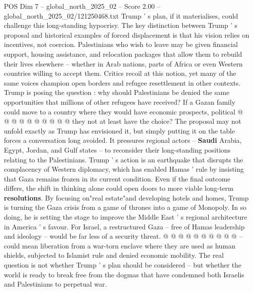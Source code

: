 \begin{textsample}{POS Dim 7 – global\_north\_2025\_02 – Score 2.00 – global\_north\_2025\_02/121250468.txt}
Trump ' s plan, if it materialises, could challenge this long-standing hypocrisy.
The key distinction between Trump ' s proposal and historical examples of forced displacement is that his vision relies on incentives, not coercion.
Palestinians who wish to leave may be given financial support, housing assistance, and relocation packages that allow them to rebuild their lives elsewhere -- whether in Arab nations, parts of Africa or even Western countries willing to accept them.
Critics recoil at this notion, yet many of the same voices champion open borders and refugee resettlement in other contexts.
Trump is posing the question : why should Palestinians be denied the same opportunities that millions of other refugees have received?
If a Gazan family could move to a country where they would have economic prospects, political @ @ @ @ @ @ @ @ @ @ they not at least have the choice?
The proposal may not unfold exactly as Trump has envisioned it, but simply putting it on the table forces a conversation long avoided.
It pressures regional actors -- \textbf{Saudi} Arabia, Egypt, Jordan, and Gulf states -- to reconsider their long-standing positions relating to the Palestinians.
Trump ' s action is an earthquake that disrupts the complacency of Western diplomacy, which has enabled Hamas ' rule by insisting that Gaza remains frozen in its current condition.
Even if the final outcome differs, the shift in thinking alone could open doors to more viable long-term \textbf{resolutions}.
By focusing on"real estate"and developing hotels and homes, Trump is turning the Gaza crisis from a game of thrones into a game of Monopoly.
In so doing, he is setting the stage to improve the Middle East ' s regional architecture in America ' s favour.
For Israel, a restructured Gaza -- free of Hamas leadership and ideology -- would be far less of a security threat. @ @ @ @ @ @ @ @ @ @ -- could mean liberation from a war-torn enclave where they are used as human shields, subjected to Islamist rule and denied economic mobility.
The real question is not whether Trump ' s plan should be considered -- but whether the world is ready to break free from the dogmas that have condemned both Israelis and Palestinians to perpetual war.

\end{textsample}
